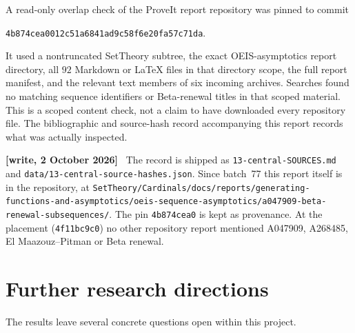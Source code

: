 \documentclass[11pt]{article}
\numberwithin{equation}{section}
\theoremstyle{remark}\newtheorem{remark}[theorem]{Remark}
\newcommand{\file}[1]{\nolinkurl{#1}}
\newenvironment{writenote}{\par\smallskip\begingroup\small\noindent\textbf{[write, 2 October 2026]}\ }{\par\endgroup\smallskip}
\begin{document}
A read-only overlap check of the ProveIt report repository was pinned to
commit\par
\noindent\texttt{4b874cea0012c51a6841ad9c58f6e20fa57c71da}.\par
It used a nontruncated SetTheory subtree, the exact OEIS-asymptotics
report directory, all $92$ Markdown or \LaTeX{} files in that directory
scope, the full report manifest, and the relevant text members of six
incoming archives.  Searches found no matching sequence identifiers or
Beta-renewal titles in that scoped material.  This is a scoped content
check, not a claim to have downloaded every repository file.  The
bibliographic and source-hash record accompanying this report records
what was actually inspected.

\begin{writenote}
The record is shipped as \file{13-central-SOURCES.md} and \file{data/13-central-source-hashes.json}. Since batch~77 this report itself is in the repository, at \file{SetTheory/Cardinals/docs/reports/generating-functions-and-asymptotics/}\allowbreak\file{oeis-sequence-asymptotics/a047909-beta-renewal-subsequences/}. The pin \texttt{4b874cea0} is kept as provenance. At the placement (\texttt{4f11bc9c0}) no other repository report mentioned A047909, A268485, El Maazouz--Pitman or Beta renewal.
\end{writenote}

\section{Further research directions}\label{brs:sec:further}

The results leave several concrete questions open within this project.
\end{document}
